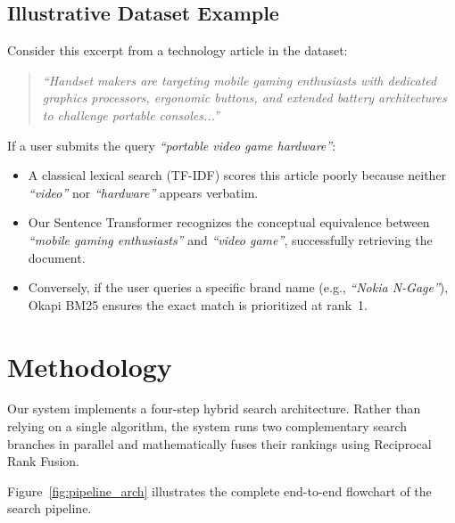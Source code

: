 \documentclass[11pt,a4paper]{article}
\begin{document}
\subsection{Illustrative Dataset Example}
Consider this excerpt from a technology article in the dataset:
\begin{quote}
\textit{``Handset makers are targeting mobile gaming enthusiasts with dedicated graphics processors, ergonomic buttons, and extended battery architectures to challenge portable consoles...''}
\end{quote}
If a user submits the query \textit{``portable video game hardware''}:
\begin{itemize}[leftmargin=1.5em]
    \item A classical lexical search (TF-IDF) scores this article poorly because neither \textit{``video''} nor \textit{``hardware''} appears verbatim.
    \item Our Sentence Transformer recognizes the conceptual equivalence between \textit{``mobile gaming enthusiasts''} and \textit{``video game''}, successfully retrieving the document.
    \item Conversely, if the user queries a specific brand name (e.g., \textit{``Nokia N-Gage''}), Okapi BM25 ensures the exact match is prioritized at rank~1.
\end{itemize}

\newpage

\section{Methodology}

Our system implements a four-step hybrid search architecture. Rather than relying on a single algorithm, the system runs two complementary search branches in parallel and mathematically fuses their rankings using Reciprocal Rank Fusion.

Figure~\ref{fig:pipeline_arch} illustrates the complete end-to-end flowchart of the search pipeline.
\end{document}
